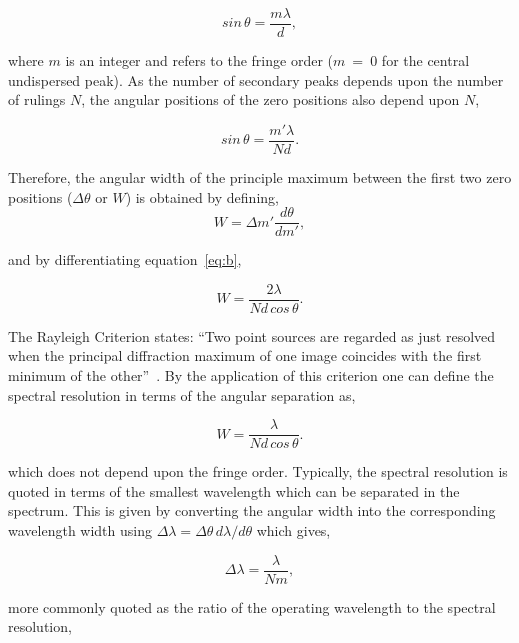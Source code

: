 \begin{equation}
    sin\,\theta = \frac{m\lambda}{d},\label{eq:a}
\end{equation}

\noindent where $m$ is an integer and refers to the fringe order ($m$~=~0 for the central undispersed peak).
As the number of secondary peaks depends upon the number of rulings $N$, the angular positions of the zero positions also depend upon $N$,

\begin{equation}
    sin\,\theta = \frac{m'\lambda}{Nd}.\label{eq:b}
\end{equation}

\noindent Therefore, the angular width of the principle maximum between the first two zero positions ($\Delta\theta$ or $W$) is obtained by defining,
\begin{equation}
     W = \Delta m'\frac{d\theta}{dm'},\label{eq:c}
\end{equation}

\noindent and by differentiating equation~\ref{eq:b},

\begin{equation}
    W = \frac{2\lambda}{Nd\,cos\,\theta}.\label{eq:d}
\end{equation}

\noindent The Rayleigh Criterion states: ``Two point sources are regarded as just resolved when the principal diffraction maximum of one image coincides with the first minimum of the other''~\citep{1880MNRAS..40..254R}.
By the application of this criterion one can define the spectral resolution in terms of the angular separation as,

\begin{equation}
    W = \frac{\lambda}{Nd\,cos\,\theta}.\label{eq:e}
\end{equation}

\noident which does not depend upon the fringe order.
Typically, the spectral resolution is quoted in terms of the smallest wavelength which can be separated in the spectrum.
This is given by converting the angular width into the corresponding wavelength width using $\Delta\lambda = \Delta\theta\,d\lambda/d\theta$ which gives,

\begin{equation}
    \Delta\lambda = \frac{\lambda}{Nm},\label{eq:f}
\end{equation}

\noindent more commonly quoted as the ratio of the operating wavelength to the spectral resolution,

